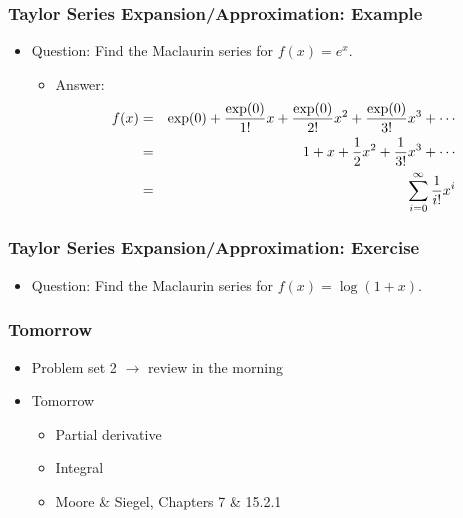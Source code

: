 \documentclass[pdflatex, 12pt]{beamer}
\begin{document}
\begin{frame}
\frametitle{Taylor Series Expansion/Approximation: Example}
\begin{itemize}
\item Question: Find the Maclaurin series for $f(x) = e^x$.
\vspace{0.4cm}
 \begin{itemize}
 \item Answer:
  {\footnotesize
  \begin{eqnarray}
  f(x) &=& \exp(0) + \frac{\exp(0)}{1!}x + \frac{\exp(0)}{2!}x^2 + \frac{\exp(0)}{3!}x^3 + \cdots \notag \\
  &=& 1 + x + \frac{1}{2}x^2 + \frac{1}{3!}x^3 + \cdots \notag \\
  &=& \sum_{i = 0}^{\infty} \frac{1}{i!}x^i \notag
  \end{eqnarray}
  }
 \end{itemize}
\end{itemize}
\end{frame}

\begin{frame}
\frametitle{Taylor Series Expansion/Approximation: Exercise}
\begin{itemize}
\item Question: Find the Maclaurin series for $f(x) = \log(1 + x)$.
\end{itemize}
\end{frame}

\begin{frame}
\frametitle{Tomorrow}
\begin{itemize}
\item Problem set 2 $\rightarrow$ review in the morning
\vspace{0.4cm}
\item Tomorrow
 \begin{itemize}
 \item Partial derivative
 \item Integral
 \item Moore \& Siegel, Chapters 7 \& 15.2.1
 \end{itemize}
\end{itemize}
\end{frame}
\end{document}

